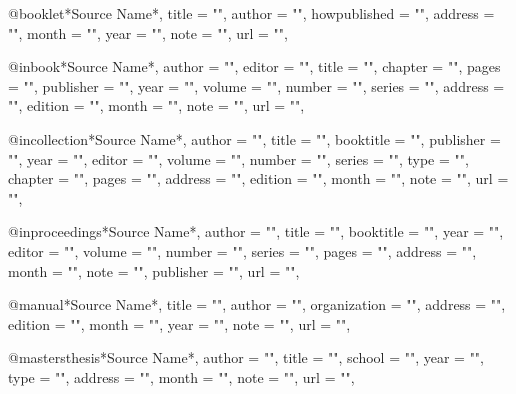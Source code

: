@booklet{*Source Name*,
    title           = "",
    author          = "",
    howpublished    = "",
    address         = "",   %
    month           = "",   %
    year            = "",   %
    note            = "",   %
    url             = "",   %
}

@inbook{*Source Name*,
    author      = "",   %
    editor      = "",   %
    title       = "",
    chapter     = "",
    pages       = "",
    publisher   = "",
    year        = "",
    volume      = "",   %
    number      = "",   %
    series      = "",   %
    address     = "",   %
    edition     = "",   %
    month       = "",   %
    note        = "",   %
    url         = "",   %
}

@incollection{*Source Name*,
    author      = "",
    title       = "",
    booktitle   = "",
    publisher   = "",
    year        = "",
    editor      = "",   %
    volume      = "",   %
    number      = "",   %
    series      = "",   %
    type        = "",   %
    chapter     = "",   %
    pages       = "",   %
    address     = "",   %
    edition     = "",   %
    month       = "",   %
    note        = "",   %
    url         = "",   %
}

@inproceedings{*Source Name*,
    author      = "",
    title       = "",
    booktitle   = "",
    year        = "",
    editor      = "",   %
    volume      = "",   %
    number      = "",   %
    series      = "",   %
    pages       = "",   %
    address     = "",   %
    month       = "",   %
    note        = "",   %
    publisher   = "",   %
    url         = "",   %
}

@manual{*Source Name*,
    title           = "",
    author          = "",   %
    organization    = "",   %
    address         = "",   %
    edition         = "",   %
    month           = "",   %
    year            = "",   %
    note            = "",   %
    url             = "",   %
}

@mastersthesis{*Source Name*,
    author      = "",
    title       = "",
    school      = "",
    year        = "",
    type        = "",   %
    address     = "",   %
    month       = "",   %
    note        = "",   %
    url         = "",   %
}

